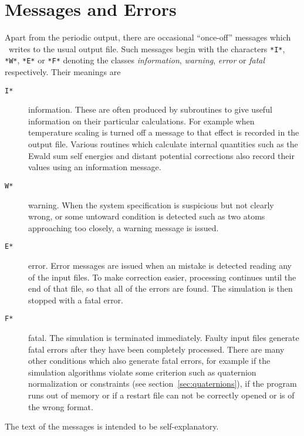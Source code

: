 \section{Messages and Errors}%

Apart from the periodic output, there are occasional ``once-off''
messages which \moldy\  writes to the usual output file.  Such messages
begin with the characters \verb'*I*', \verb'*W*', \verb'*E*' or
\verb'*F*' denoting the classes {\em information}, {\em warning}, {\em
error\/} or {\em fatal\/} respectively.  Their meanings are
\begin{description}
\item[{\tt*I*}] information. These are often produced by subroutines
to give useful information on their particular calculations.  For
example when temperature scaling is turned off a message to that
effect is recorded in the output file.  Various routines which
calculate internal quantities such as the Ewald sum self energies and
distant potential corrections also record their values using an
information message.
\item[{\tt*W*}] warning.  When the system specification is suspicious
but not clearly wrong, or some untoward condition is detected such as
two atoms approaching too closely, a warning message is issued.
\item[{\tt*E*}] error. Error messages are issued when an mistake is
detected reading any of the input files. To make correction easier,
processing continues until the end of that file, so that all of the
errors are found.  The simulation is then stopped with a fatal error.
\item[{\tt*F*}] fatal. The simulation is terminated immediately. Faulty 
input files generate fatal errors after they have been completely
processed.  There are many other conditions which also generate fatal
errors, for example if the simulation algorithms violate some
criterion such as quaternion normalization or constraints (see
section~\ref{sec:quaternions}), if the program runs out of memory or
if a restart file can not be correctly opened or is of the wrong
format.
\end{description}
The text of the messages is intended to be self-explanatory.

